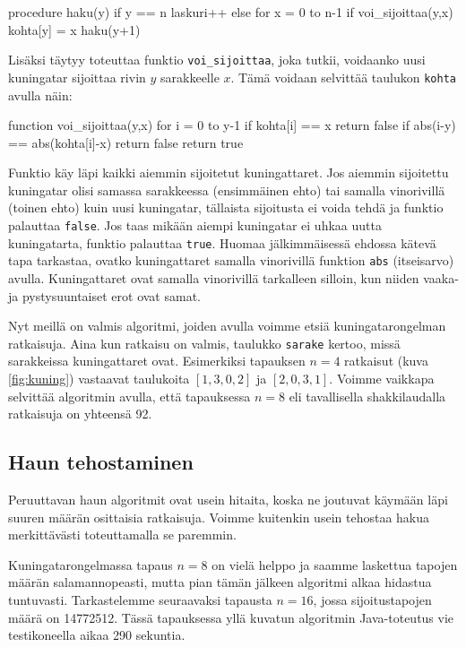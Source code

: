 \begin{code}
procedure haku(y)
    if y == n
        laskuri++
    else
        for x = 0 to n-1
            if voi_sijoittaa(y,x)
                kohta[y] = x
                haku(y+1)
\end{code}

Lisäksi täytyy toteuttaa funktio \texttt{voi\_sijoittaa},
joka tutkii, voidaanko uusi kuningatar sijoittaa
rivin $y$ sarakkeelle $x$.
Tämä voidaan selvittää taulukon \texttt{kohta} avulla näin:

\begin{code}
function voi_sijoittaa(y,x)
    for i = 0 to y-1
        if kohta[i] == x
            return false
        if abs(i-y) == abs(kohta[i]-x)
            return false
    return true
\end{code}

Funktio käy läpi kaikki aiemmin sijoitetut kuningattaret.
Jos aiemmin sijoitettu kuningatar olisi samassa sarakkeessa
(ensimmäinen ehto) tai samalla vinorivillä (toinen ehto)
kuin uusi kuningatar, tällaista sijoitusta ei voida tehdä
ja funktio palauttaa \texttt{false}.
Jos taas mikään aiempi kuningatar ei uhkaa uutta kuningatarta,
funktio palauttaa \texttt{true}.
Huomaa jälkimmäisessä ehdossa kätevä tapa tarkastaa,
ovatko kuningattaret samalla vinorivillä funktion \texttt{abs}
(itseisarvo) avulla.
Kuningattaret ovat samalla vinorivillä tarkalleen silloin,
kun niiden vaaka- ja pystysuuntaiset erot ovat samat.

Nyt meillä on valmis algoritmi, joiden avulla voimme etsiä
kuningatarongelman ratkaisuja.
Aina kun ratkaisu on valmis, taulukko \texttt{sarake} kertoo,
missä sarakkeissa kuningattaret ovat.
Esimerkiksi tapauksen $n=4$ ratkaisut (kuva \ref{fig:kuning})
vastaavat taulukoita $[1,3,0,2]$ ja $[2,0,3,1]$.
Voimme vaikkapa selvittää algoritmin avulla,
että tapauksessa $n=8$ eli tavallisella shakkilaudalla
ratkaisuja on yhteensä 92.

\subsection{Haun tehostaminen}

Peruuttavan haun algoritmit ovat usein hitaita,
koska ne joutuvat käymään läpi suuren määrän osittaisia ratkaisuja.
Voimme kuitenkin usein tehostaa hakua merkittävästi
toteuttamalla se paremmin.

Kuningatarongelmassa tapaus $n=8$ on vielä helppo ja
saamme laskettua tapojen määrän salamannopeasti,
mutta pian tämän jälkeen algoritmi alkaa hidastua tuntuvasti.
Tarkastelemme seuraavaksi tapausta $n=16$,
jossa sijoitustapojen määrä on 14772512.
Tässä tapauksessa yllä kuvatun algoritmin
Java-toteutus vie testikoneella aikaa 290 sekuntia.

